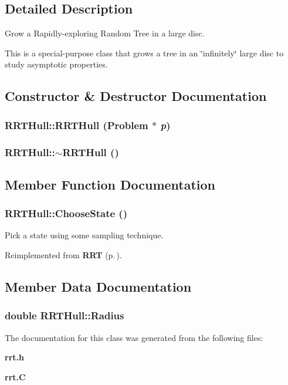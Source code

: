 \subsection{Detailed Description}
Grow a Rapidly-exploring Random Tree in a large disc.

This is a special-purpose class that grows a tree in an \char`\"{}infinitely\char`\"{} large disc to study asymptotic properties. 



\subsection{Constructor \& Destructor Documentation}
\subsubsection{\setlength{\rightskip}{0pt plus 5cm}RRTHull::RRTHull ({\bf Problem} $\ast$ {\em p})}\label{classRRTHull_a0}


\subsubsection{\setlength{\rightskip}{0pt plus 5cm}RRTHull::$\sim$RRTHull ()\hspace{0.3cm}{\tt  [inline, virtual]}}\label{classRRTHull_a1}




\subsection{Member Function Documentation}
\subsubsection{ RRTHull::Choose\-State ()\hspace{0.3cm}{\tt  [protected, virtual]}}\label{classRRTHull_b0}


Pick a state using some sampling technique.



Reimplemented from {\bf RRT} {\rm (p.\,\pageref{classRRT_b4})}.

\subsection{Member Data Documentation}
\subsubsection{\setlength{\rightskip}{0pt plus 5cm}double RRTHull::Radius}\label{classRRTHull_m0}




The documentation for this class was generated from the following files:\begin{CompactItemize}
\item 
{\bf rrt.h}\item 
{\bf rrt.C}\end{CompactItemize}
